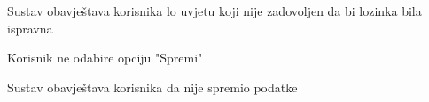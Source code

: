 \begin{packed_item}
\begin{packed_item}
\begin{packed_enum}
								\item Sustav obavještava korisnika lo uvjetu koji nije zadovoljen da bi lozinka bila ispravna
								
							\end{packed_enum}
							
						\end{packed_item}
						
						\item[] \begin{packed_item}
							
							\item[4.a]Korisnik ne odabire opciju "Spremi"
							\item[] \begin{packed_enum}
								
								\item Sustav obavještava korisnika da nije spremio podatke 
								
							\end{packed_enum}
							
						\end{packed_item}
					\end{packed_item}
					
